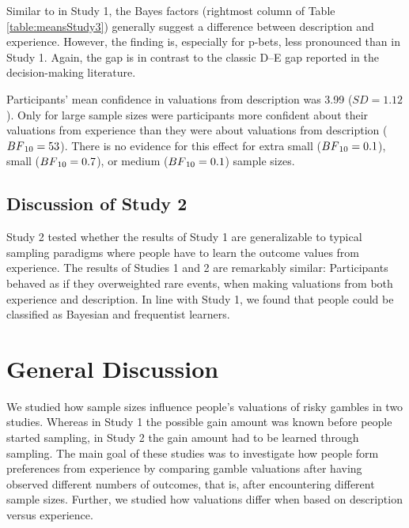 \documentclass[a4paper, man, natbib, floatsintext]{apa6} %
\begin{document}
Similar to in Study 1, the Bayes factors (rightmost column of Table \ref{table:meansStudy3}) generally suggest a difference between description and experience. However, the finding is, especially for p-bets, less pronounced than in Study 1. Again, the gap is in contrast to the classic D--E gap reported in the decision-making literature.

Participants' mean confidence in valuations from description was 3.99 ($SD = 1.12$). Only for large sample sizes were participants more confident about their valuations from experience than they were about valuations from description ($BF\textsubscript{10} = 53$). There is no evidence for this effect for extra small ($BF\textsubscript{10} = 0.1$), small ($BF\textsubscript{10} = 0.7$), or medium ($BF\textsubscript{10} = 0.1$) sample sizes.
\subsection{Discussion of Study 2}
Study 2 tested whether the results of Study 1 are generalizable to typical sampling paradigms where people have to learn the outcome values from experience. The results of Studies 1 and 2 are remarkably similar: Participants behaved as if they overweighted rare events, when making valuations from both experience and description. In line with Study 1, we found that people could be classified as Bayesian and frequentist learners.

\section{General Discussion}
We studied how sample sizes influence people's valuations of risky gambles in two studies. Whereas in Study 1 the possible gain amount was known before people started sampling, in Study 2 the gain amount had to be learned through sampling. The main goal of these studies was to investigate how people form preferences from experience by comparing gamble valuations after having observed different numbers of outcomes, that is, after encountering different sample sizes. Further, we studied how valuations differ when based on description versus experience. 

\end{document}
